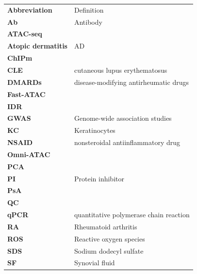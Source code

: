 \begin{table}[H]
\singlespacing
  \centering
   \begin{tabular}{@{}m{2.5cm}m{10cm}@{}}
	  \textbf{Abbreviation} & Definition \\
		\textbf{Ab} & Antibody\\
		\textbf{ATAC-seq} & \\
		\textbf{Atopic dermatitis} & AD \\
		\textbf{ChIPm} &  \\
		\textbf{CLE} & cutaneous lupus erythematosus \\
		\textbf{DMARDs} & disease-modifying antirheumatic drugs \\
		\textbf{Fast-ATAC} & \\
		\textbf{IDR} & \\
		\textbf{GWAS} & Genome-wide association studies\\
		\textbf{KC} & Keratinocytes \\
		\textbf{NSAID} & nonsteroidal antiinflammatory drug \\
		\textbf{Omni-ATAC} & \\
		\textbf{PCA} & \\
		\textbf{PI} & Protein inhibitor \\
		\textbf{PsA} &  \\
		\textbf{QC} & \\
		\textbf{qPCR} & quantitative polymerase chain reaction \\
		\textbf{RA} & Rheumatoid arthritis \\
		\textbf{ROS} & Reactive oxygen species \\
		\textbf{SDS} & Sodium dodecyl sulfate \\
		\textbf{SF} & Synovial fluid\\
    \end{tabular}%
\end{table}%
%
